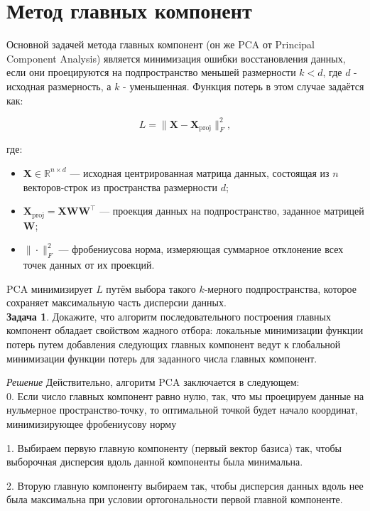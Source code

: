 \section{Метод главных компонент}


Основной задачей метода главных компонент (он же PCA от Principal Component Analysis)  является минимизация ошибки восстановления данных, если они проецируются на подпространство меньшей размерности $k<d$, где $d$ - исходная размерность, а $k$ - уменьшенная. Функция потерь в этом случае задаётся как:

\[
    L = \| \mathbf{X} - \mathbf{X}_{\text{proj}} \|_F^2,
\]

где:

\begin{itemize}
    \item \( \mathbf{X} \in \mathbb{R}^{n \times d} \) — исходная центрированная матрица данных, состоящая из $n$ векторов-строк из пространства размерности $d$;
    \item \( \mathbf{X}_{\text{proj}} = \mathbf{X} \mathbf{W} \mathbf{W}^\top \) — проекция данных на подпространство, заданное матрицей \( \mathbf{W} \);
    \item \( \| \cdot \|_F^2 \) — фробениусова норма, измеряющая суммарное отклонение всех точек данных от их проекций.
\end{itemize}

PCA минимизирует \( L \) путём выбора такого \( k \)-мерного подпространства, которое сохраняет максимальную часть дисперсии данных. \\

\textbf{Задача 1}. Докажите, что алгоритм последовательного построения главных компонент обладает свойством жадного отбора: локальные минимизации функции потерь путем добавления следующих главных компонент ведут к глобальной минимизации функции потерь для заданного числа главных компонент.

\textit{Решение}
Действительно, алгоритм PCA заключается в следующем:\\

0. Если число главных компонент равно нулю, так, что мы проецируем данные на нульмерное пространство-точку, то оптимальной точкой будет начало координат, минимизирующее фробениусову норму

1. Выбираем первую главную компоненту (первый вектор базиса) так, чтобы выборочная дисперсия вдоль данной компоненты была минимальна.

2. Вторую главную компоненту выбираем так, чтобы дисперсия данных вдоль нее была максимальна при условии ортогональности первой главной компоненте.

